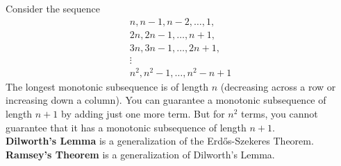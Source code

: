 \documentclass[12pt]{extarticle}
\begin{document}
Consider the sequence $$\begin{matrix}
    n,n-1,n-2,\dots,1,\\
    2n,2n-1,\dots,n+1,\\
    3n,3n-1,\dots,2n+1,\\
    \vdots\\
    n^2,n^2-1,\dots,n^2-n+1
\end{matrix}$$
The longest monotonic subsequence is of length $n$ (decreasing across a row or increasing down a column). You can guarantee a monotonic subsequence of length $n+1$ by adding just one more term. But for $n^2$ terms, you cannot guarantee that it has a monotonic subsequence of length $n+1$.\\
\textbf{Dilworth's Lemma} is a generalization of the Erdős-Szekeres Theorem. \textbf{Ramsey's Theorem} is a generalization of Dilworth's Lemma. 
\end{document}
